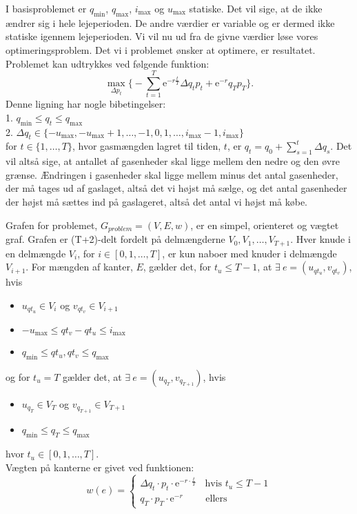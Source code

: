 I basisproblemet er $q_{\min}$, $q_{\max}$, $i_{\max}$ og $u_{\max}$ statiske. Det vil sige, at de ikke ændrer sig i hele lejeperioden. De andre værdier er variable og er dermed ikke statiske igennem lejeperioden. Vi vil nu ud fra de givne værdier løse vores optimeringsproblem. Det vi i problemet ønsker at optimere, er resultatet. Problemet kan udtrykkes ved følgende funktion:
\begin{equation}
\max_{\Delta p_{t}} \Bigg\{ -\sum_{t=1}^{T} \mathrm{e}^{-r\frac{t}{T}} \Delta q_{t} p_{t}+ \mathrm{e}^{-r}q_{T}p_{T} \Bigg\}.
\end{equation}
Denne ligning har nogle bibetingelser:\\
1. $q_{\min} \leq q_{t} \leq q_{\max}$\\
2. $\Delta q_{t} \in \{-u_{\max},-u_{\max}+1,\dotsc,-1,0,1,\dotsc,i_{\max}-1,i_{\max} \}$ \\
for $t \in \{1,\dotsc,T\}$, hvor gasmængden lagret til tiden, $t$, er $q_{t}=q_{0}+\sum_{s=1}^{t} \Delta q_{s}$.
Det vil altså sige, at antallet af gasenheder skal ligge mellem den nedre og den øvre grænse. Ændringen i gasenheder skal ligge mellem minus det antal gasenheder, der må tages ud af gaslaget, altså det vi højst må sælge, og det antal gasenheder der højst må sættes ind på gaslageret, altså det antal vi højst må købe.


\begin{defn}
Grafen for problemet, $G_{problem}=(V,E,w)$, er en simpel, orienteret og vægtet graf. Grafen er (T+2)-delt fordelt på delmængderne $V_0,V_1, \dotsc, V_{T+1}$.
Hver knude i en delmængde $V_i$, for $i \in [0,1, \dotsc, T]$, er kun naboer med knuder i delmængde $V_{i+1}$. 
For mængden af kanter, $E$, gælder det, for $t_u \leq T-1$, at $\exists \ e=(u_{qt_u}, v_{qt_v})$, hvis
	\begin{itemize}
	\item $u_{qt_u} \in V_i$ og $v_{qt_v} \in V_{i+1}$
	\item $-u_{\max} \leq qt_v-qt_u \leq i_{\max}$
	\item $q_{\min} \leq qt_u,qt_v \leq q_{\max}$
	\end{itemize}
og for $t_u = T$ gælder det, at $\exists \ e = (u_{q_T}, v_{q_{T+1}})$, hvis
	\begin{itemize}
	\item $u_{q_{T}} \in V_T$ og $v_{q_{T+1}} \in V_{T+1}$
	\item $q_{\min} \leq q_{T} \leq q_{\max}$
	\end{itemize}
hvor $t_u \in [0,1, \dotsc, T]$. \\
Vægten på kanterne er givet ved funktionen:
\begin{equation}
w(e)=
	\begin{cases}
	\Delta q_t \cdot p_t \cdot \textrm{e}^{-r \cdot \frac{t}{T}} \ \ \ \ \mbox{hvis } t_u \leq T-1 \\
	q_T \cdot p_T \cdot \textrm{e}^{-r} \qquad \mbox{ ellers}
	\end{cases}
\end{equation}



\end{defn}
